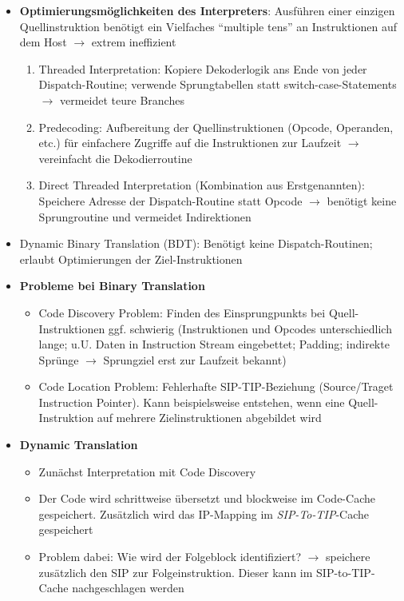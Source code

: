 \begin{itemize}
	\item \textbf{Optimierungsmöglichkeiten des Interpreters}: Ausführen einer einzigen Quellinstruktion benötigt ein Vielfaches "`multiple tens"' an Instruktionen auf dem Host \(\rightarrow\) extrem ineffizient
	\begin{enumerate} %
		\item Threaded Interpretation: Kopiere Dekoderlogik ans Ende von jeder Dispatch-Routine; verwende Sprungtabellen statt switch-case-Statements \(\rightarrow\) vermeidet teure Branches
		\item Predecoding: Aufbereitung der Quellinstruktionen (Opcode, Operanden, etc.) für einfachere Zugriffe auf die Instruktionen zur Laufzeit \(\rightarrow\) vereinfacht die Dekodierroutine
		\item Direct Threaded Interpretation (Kombination aus Erstgenannten): Speichere Adresse der Dispatch-Routine statt Opcode \(\rightarrow\) benötigt keine Sprungroutine und vermeidet Indirektionen 
	\end{enumerate}
	\item Dynamic Binary Translation (BDT): Benötigt keine Dispatch-Routinen; erlaubt Optimierungen der Ziel-Instruktionen
	\item \textbf{Probleme bei Binary Translation}
	\begin{itemize}
		\item Code Discovery Problem: Finden des Einsprungpunkts bei Quell-Instruktionen ggf. schwierig (Instruktionen und Opcodes unterschiedlich lange; u.U. Daten in Instruction Stream eingebettet; Padding; indirekte Sprünge \(\rightarrow\) Sprungziel erst zur Laufzeit bekannt)
		\item Code Location Problem: Fehlerhafte SIP-TIP-Beziehung (Source/Traget Instruction Pointer). Kann beispielsweise entstehen, wenn eine Quell-Instruktion auf mehrere Zielinstruktionen abgebildet wird
	\end{itemize}
	\item \textbf{Dynamic Translation}
	\begin{itemize}
		\item Zunächst Interpretation mit Code Discovery
		\item Der Code wird schrittweise übersetzt und blockweise im Code-Cache gespeichert. Zusätzlich wird das IP-Mapping im \textit{SIP-To-TIP}-Cache gespeichert
		\item Problem dabei: Wie wird der Folgeblock identifiziert? \(\rightarrow\) speichere zusätzlich den SIP zur Folgeinstruktion. Dieser kann im SIP-to-TIP-Cache nachgeschlagen werden

\end{itemize}
\end{itemize}
